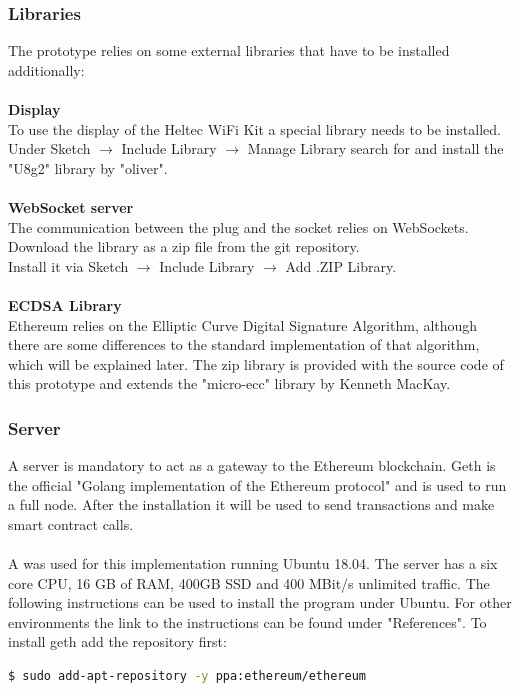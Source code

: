 \subsubsection{Libraries}
The prototype relies on some external libraries that have to be installed additionally:
\\\\
\textbf{Display}\\
To use the display of the Heltec WiFi Kit a special library needs to be installed. Under Sketch $\rightarrow$ Include Library $\rightarrow$ Manage Library search for and install the "U8g2" library by "oliver".
\\\\
\textbf{WebSocket server}\\
The communication between the plug and the socket relies on WebSockets. Download the library as a zip file from the git repository\cite{websockets}.
\\
Install it via Sketch $\rightarrow$ Include Library $\rightarrow$ Add .ZIP Library.
\\\\
\textbf{ECDSA Library}\\
Ethereum relies on the Elliptic Curve Digital Signature Algorithm, although there are some differences to the standard implementation of that algorithm, which will be explained later. The zip library is provided with the source code of this prototype and extends the "micro-ecc" library by Kenneth MacKay\cite{micro-ecc}.
\\

\subsubsection{Server}
A server is mandatory to act as a gateway to the Ethereum blockchain. Geth is the official "Golang implementation of the Ethereum protocol"\cite{geth} and is used to run a full node. After the installation it will be used to send transactions and make smart contract calls.
\\\\
A  was used for this implementation running Ubuntu 18.04. The server has a six core CPU, 16 GB of RAM, 400GB SSD and 400 MBit/s unlimited traffic. The following instructions can be used to install the program under Ubuntu. For other environments the link to the instructions can be found under "References"\cite{geth-instructions}.
\newpage
To install geth add the repository first:
\begin{lstlisting}[language=bash]
  $ sudo add-apt-repository -y ppa:ethereum/ethereum
\end{lstlisting}

